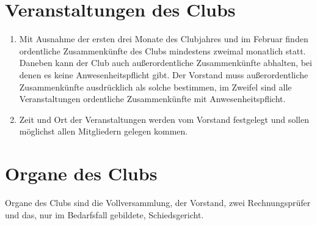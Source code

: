 \documentclass{article}
\begin{document}
\section{Veranstaltungen des Clubs}
\begin{enumerate}
    \item Mit Ausnahme der ersten drei Monate des Clubjahres und im Februar finden ordentliche Zusammenkünfte des Clubs mindestens zweimal monatlich statt. Daneben kann der Club auch außerordentliche Zusammenkünfte abhalten, bei denen es keine Anwesenheitspflicht gibt. Der Vorstand muss außerordentliche Zusammenkünfte ausdrücklich als solche bestimmen, im Zweifel sind alle Veranstaltungen ordentliche Zusammenkünfte mit Anwesenheitspflicht.
    \item Zeit und Ort der Veranstaltungen werden vom Vorstand festgelegt und sollen möglichst allen Mitgliedern gelegen kommen. 
\end{enumerate}

\section{Organe des Clubs}
Organe des Clubs sind die Vollversammlung, der Vorstand, zwei Rechnungsprüfer und das, nur im Bedarfsfall gebildete, Schiedsgericht.
\end{document}

